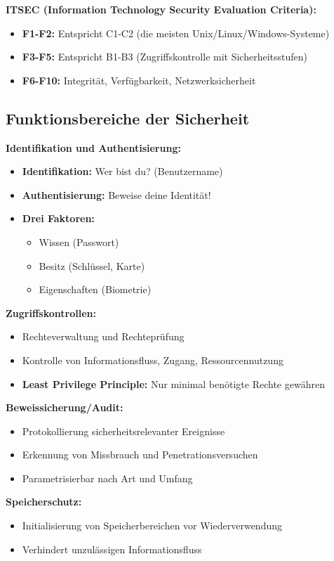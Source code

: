 \documentclass[9pt,a4paper]{extarticle}
\begin{document}
\begin{multicols*}{2}
\textbf{ITSEC (Information Technology Security Evaluation Criteria):}
\begin{itemize}
\item \textbf{F1-F2:} Entspricht C1-C2 (die meisten Unix/Linux/Windows-Systeme)
\item \textbf{F3-F5:} Entspricht B1-B3 (Zugriffskontrolle mit Sicherheitsstufen)
\item \textbf{F6-F10:} Integrität, Verfügbarkeit, Netzwerksicherheit
\end{itemize}

\subsection{Funktionsbereiche der Sicherheit}
\textbf{Identifikation und Authentisierung:}
\begin{itemize}
\item \textbf{Identifikation:} Wer bist du? (Benutzername)
\item \textbf{Authentisierung:} Beweise deine Identität!
\item \textbf{Drei Faktoren:}
  \begin{itemize}
  \item Wissen (Passwort)
  \item Besitz (Schlüssel, Karte)
  \item Eigenschaften (Biometrie)
  \end{itemize}
\end{itemize}

\textbf{Zugriffskontrollen:}
\begin{itemize}
\item Rechteverwaltung und Rechteprüfung
\item Kontrolle von Informationsfluss, Zugang, Ressourcennutzung
\item \textbf{Least Privilege Principle:} Nur minimal benötigte Rechte gewähren
\end{itemize}

\textbf{Beweissicherung/Audit:}
\begin{itemize}
\item Protokollierung sicherheitsrelevanter Ereignisse
\item Erkennung von Missbrauch und Penetrationsversuchen
\item Parametrisierbar nach Art und Umfang
\end{itemize}

\textbf{Speicherschutz:}
\begin{itemize}
\item Initialisierung von Speicherbereichen vor Wiederverwendung
\item Verhindert unzulässigen Informationsfluss
\end{itemize}


\end{multicols*}
\end{document}
